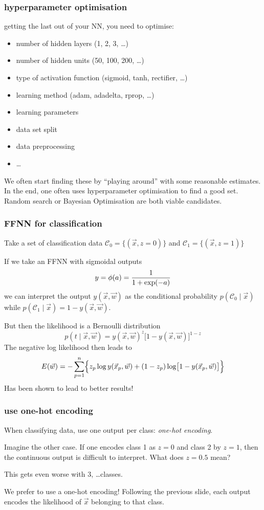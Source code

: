 \documentclass[USenglish,pdftex,compress,10pt,svgnamesi,handout]{beamer}
\newcommand{\bfw}{\Vec{w}}
\newcommand{\bfx}{\Vec{x}}
\begin{document}
\begin{frame}
\frametitle{hyperparameter optimisation}
getting the last out of your NN, you need to optimise:
\begin{itemize}
\item number of hidden layers (1, 2, 3, \dots)
\item number of hidden units (50, 100, 200, \dots)
\item type of activation function (sigmoid, tanh, rectifier, \dots)
\item learning method (adam, adadelta, rprop, \dots)
\item learning parameters
\item data set split
\item data preprocessing
\item \dots
\end{itemize}
We often start finding these by ``playing around'' with some reasonable estimates.
In the end, one often uses hyperparameter optimisation to find a good set.
Random search or Bayesian Optimisation are both viable candidates.
\end{frame}


\begin{frame}
\frametitle{FFNN for classification}
Take a set of classification data $\mathcal C_0 = \{(\bfx, z=0)\}$ and  $\mathcal C_1 = \{(\bfx, z=1)\}$

If we take an FFNN with sigmoidal outputs
$$
y = \phi(a) = {1 \over 1 + \exp(-a)}
$$
we can interpret the output $y(\bfx, \bfw)$ as the conditional
probability $p(\mathcal C_0 \mid \bfx)$ while $p(\mathcal C_1 \mid \bfx) = 1-y(\bfx,\bfw)$.

\pause
But then the likelihood is a Bernoulli distribution
$$
p(t \mid \bfx, \bfw) = y(\bfx, \bfw)^z \bigl[1-y(\bfx,\bfw)\bigr]^{1-z}
$$
\pause
The negative log likelihood then leads to
$$
E(\bfw) = -\sum_{p=1}^n \Bigl\{
	z_p \log y(\bfx_p, \bfw) + (1 - z_p) \log \bigl[1 - y(\bfx_p, \bfw)\bigl]
	\Bigr\}
$$
Has been shown to lead to better results!
\end{frame}




\begin{frame}
\frametitle{use one-hot encoding}
When classifying data, use one output per class: \textsl{one-hot encoding}.

Imagine the other case.  If one encodes class 1 as $z=0$ and class 2 by $z=1$, then the continuous output is difficult to interpret. 
What does $z=0.5$ mean?

This gets even worse with 3, \dots classes.

We prefer to use a one-hot encoding!  Following the previous slide, each output encodes the likelihood of $\Vec x$ belonging to that class.

\end{frame}
\end{document}
